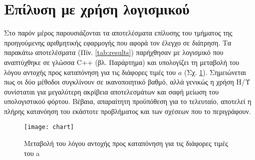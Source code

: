 \section{Επίλυση με χρήση λογισμικού}
Στο παρόν μέρος παρουσιάζονται τα αποτελέσματα επίλυσης του τμήματος της προηγούμενης αριθμητικής εφαρμογής που αφορά τον έλεγχο σε διάτρηση. Τα παρακάτω αποτελέσματα (Πίν. \ref{tab:results}) παρήχθησαν με λογισμικό που αναπτύχθηκε σε γλώσσα \textlatin{C++} (βλ. Παράρτημα) και υπολογίζει τη μεταβολή  του λόγου αντοχής προς καταπόνηση για τις διάφορες τιμές του $a$ (Σχ. \ref{fig:chart}). Σημειώνεται πως οι δύο μέθοδοι συγκλίνουν σε ικανοποιητικό βαθμό, αλλά γενικώς η χρήση Η/Υ συνίσταται για μεγαλύτερη ακρίβεια αποτελεσμάτων και σαφή μείωση του υπολογιστικού φόρτου. Βέβαια, απαραίτητη προϋπόθεση για το τελευταίο, αποτελεί η πλήρης κατανόηση του εκάστοτε προβλήματος και των σχέσεων που το περιγράφουν.

\begin{figure}[H]
  \centering
  \texttt{[image: chart]}
  \caption{Μεταβολή του λόγου αντοχής προς καταπόνηση για τις διάφορες τιμές του \textlatin{a}}
  \label{fig:chart}
\end{figure}

